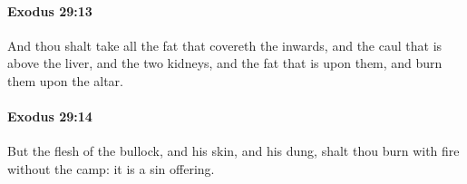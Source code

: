 		\paragraph{Exodus 29:13} %
			\label{EXODUS-29-13}

			And thou shalt take all the fat that covereth the inwards, and the caul that is above the liver, and the two kidneys, and the fat that is upon them, and burn them upon the altar.


		\paragraph{Exodus 29:14} %
			\label{EXODUS-29-14}

			But the flesh of the bullock, and his skin, and his dung, shalt thou burn with fire without the camp: it is a sin offering.


